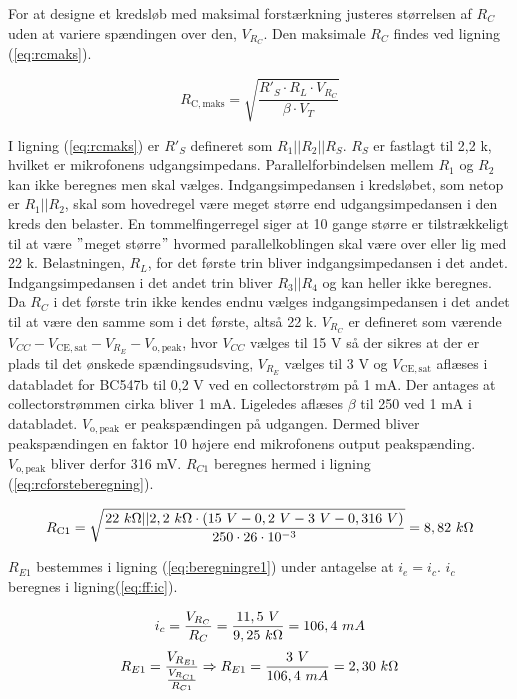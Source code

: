 For at designe et kredsløb med maksimal forstærkning justeres størrelsen af $R_C$ uden at variere spændingen over den, $V_{R_C}$. Den maksimale $R_C$ findes ved ligning (\ref{eq:rcmaks}).

\begin{equation}
R_{\mathrm{C,maks}} = \sqrt{\frac{R'_S \cdot R_L \cdot V_{R_C}}{\beta \cdot V_T}}
\label{eq:rcmaks}
\end{equation}

I ligning (\ref{eq:rcmaks}) er $R'_S$ defineret som $R_1||R_2||R_S$. $R_S$ er fastlagt til 2,2 k\ohm, hvilket er mikrofonens udgangsimpedans. Parallelforbindelsen mellem $R_1$ og $R_2$ kan ikke beregnes men skal vælges. Indgangsimpedansen i kredsløbet, som netop er $R_1||R_2$, skal som hovedregel være meget større end udgangsimpedansen i den kreds den belaster. En tommelfingerregel siger at 10 gange større er tilstrækkeligt til at være $"$meget større$"$ hvormed parallelkoblingen skal være over eller lig med 22 k\ohm. 
Belastningen, $R_L$, for det første trin bliver indgangsimpedansen i det andet. Indgangsimpedansen i det andet trin bliver $R_3||R_4$ og kan heller ikke beregnes. Da $R_C$ i det første trin ikke kendes endnu vælges indgangsimpedansen i det andet til at være den samme som i det første, altså 22 k\ohm. 
$V_{R_C}$ er defineret som værende $V_{CC} - V_{\mathrm{CE,sat}} - V_{R_E} - V_{\mathrm{o,peak}}$, hvor $V_{CC}$ vælges til 15 V så der sikres at der er plads til det ønskede spændingsudsving, $V_{R_E}$ vælges til 3 V og $V_{\mathrm{CE,sat}}$ aflæses i databladet for BC547b til 0,2 V ved en collectorstrøm på 1 mA. Der antages at collectorstrømmen cirka bliver 1 mA. Ligeledes aflæses $\beta$ til 250 ved 1 mA i databladet. $V_{\mathrm{o,peak}}$ er peakspændingen på udgangen. Dermed bliver peakspændingen en faktor 10 højere end mikrofonens output peakspænding. $V_{\mathrm{o,peak}}$ bliver derfor 316 mV. $R_{C1}$ beregnes hermed i ligning (\ref{eq:rcforsteberegning}).

\begin{equation}
R_{\mathrm{C1}} = \sqrt{\frac{22~k\ohm || 2,2~k\ohm \cdot (15~V - 0,2~V - 3~V - 0,316~V)}{250 \cdot 26 \cdot 10^{-3}}}=8,82~k\ohm
\label{eq:rcforsteberegning}
\end{equation}

$R_{E1}$ bestemmes i ligning (\ref{eq:beregningre1}) under antagelse at $i_e = i_c$.  $i_c$ beregnes i ligning(\ref{eq:ff:ic}).

\begin{equation}
\label{eq:ff:ic}
i_c=\frac{V_{R_C}}{R_C}=\frac{11,5~V}{9,25~k\ohm}=106,4~mA
\end{equation}
\begin{equation}
R_{E1}=\frac{V_{R_{E1}}}{\frac{V_{R_{C1}}}{R_{C1}}}  \Rightarrow R_{E1}=\frac{3~V}{106,4~mA}=2,30~k\ohm
\label{eq:beregningre1}
\end{equation}


